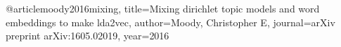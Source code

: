 @article{moody2016mixing,
  title={Mixing dirichlet topic models and word embeddings to make lda2vec},
  author={Moody, Christopher E},
  journal={arXiv preprint arXiv:1605.02019},
  year={2016}
}